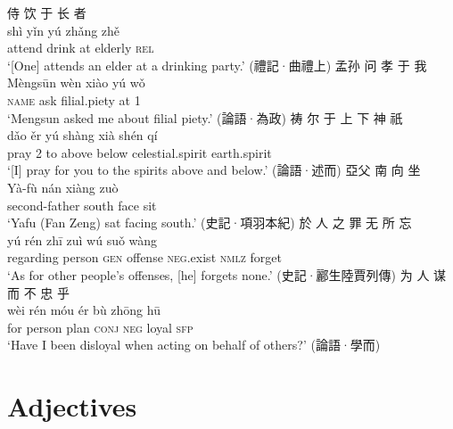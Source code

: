 \documentclass[UTF8, a4paper, oneside, scheme=plain, 12pt]{ctexrep}
\newcommand{\translate}[1]{`#1'}
\newcommand*{\category}[1]{\textsc{#1}}
\begin{document}
\begin{exe}
    \ex\label{ex:grammatical.clause.peripheral.postverbal.1}
    \glll 侍 饮 于 长 者 \\
    shì yǐn yú zhǎng zhě \\
    attend drink at elderly \category{rel} \\
    \glt\translate{[One] attends an elder at a drinking party.} \hfill (禮記·曲禮上)
    \ex\label{ex:grammatical.clause.peripheral.postverbal.2}
    \glll 孟孙 问 孝 于 我 \\
    Mèngsūn wèn xiào yú wǒ \\
    \category{name} ask filial.piety at 1 \\
    \glt\translate{Mengsun asked me about filial piety.} \hfill (論語·為政)
    \ex\label{ex:grammatical.clause.peripheral.postverbal.3}
    \glll 祷 尔 于 上 下 神 祇 \\
    dǎo ěr yú shàng xià shén qí \\
    pray 2 to above below celestial.spirit earth.spirit \\
    \glt\translate{[I] pray for you to the spirits above and below.} \hfill (論語·述而)
    \ex\label{ex:grammatical.clause.peripheral.preverbal.1}
    \glll 亞父 南 向 坐 \\
    Yà-fù nán xiàng zuò \\
    second-father south face sit \\
    \glt\translate{Yafu (Fan Zeng) sat facing south.} \hfill (史記·項羽本紀)
    \ex\label{ex:grammatical.clause.peripheral.preverbal.2}
    \glll 於 人 之 罪 无 所 忘 \\
    yú rén zhī zuì wú suǒ wàng \\
    regarding person \category{gen} offense \category{neg}.exist \category{nmlz} forget \\
    \glt\translate{As for other people's offenses, [he] forgets none.} \hfill (史記·酈生陸賈列傳)
    \ex\label{ex:grammatical.clause.peripheral.preverbal.3}
    \glll 为 人 谋 而 不 忠 乎 \\
    wèi rén móu ér bù zhōng hū \\
    for person plan \category{conj} \category{neg} loyal \category{sfp} \\
    \glt\translate{Have I been disloyal when acting on behalf of others?} \hfill (論語·學而)
\end{exe}

\chapter{Adjectives}\label{chap:adjectives}
\end{document}
